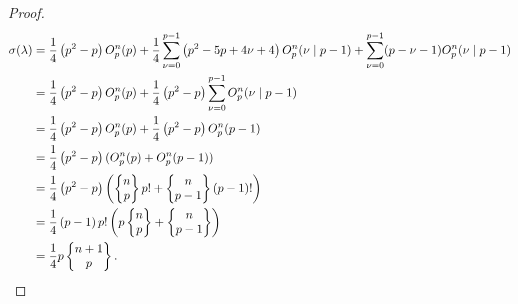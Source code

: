 \documentclass[10pt,a4paper]{amsart}
\begin{document}
\begin{proof}
\begingroup
\allowdisplaybreaks
     \begin{align*}
         \sigma(\lambda)&= \dfrac{1}{4}  \left( p^{2} -p  \right) O_p^n(  p)+ \dfrac{1}{4}   \sum_{\nu = 0}^{p-1} \left( p^{2}-5p+4\nu+4 \right) O_p^n(\nu \mid p-1)+\sum_{\nu = 0}^{p-1}  (p-\nu-1) O_p^n(\nu \mid p-1)\\
         &=\dfrac{1}{4}  \left( p^{2} -p  \right) O_p^n(  p)+\dfrac{1}{4}  \left( p^{2} -p  \right)  \sum_{\nu = 0}^{p-1}   O_p^n(\nu \mid p-1)\\
         &=\dfrac{1}{4}  \left( p^{2} -p  \right) O_p^n(  p)+\dfrac{1}{4}  \left( p^{2} -p  \right)    O_p^n(  p-1)\\
         &=\dfrac{1}{4}  \left( p^{2} -p  \right) (O_p^n(  p)+ O_p^n(  p-1))\\
         &=\dfrac{1}{4}  \left( p^{2} -p  \right) \left( \begin{Bmatrix}
             n\\p
         \end{Bmatrix}p! +\begin{Bmatrix}
             n\\p-1
         \end{Bmatrix}(p-1)! \right)\\
         &=\dfrac{1}{4}  \left( p -1  \right) p! \left( p\begin{Bmatrix}
             n\\p
         \end{Bmatrix} +\begin{Bmatrix}
             n\\p-1
         \end{Bmatrix} \right)\\
         &=\dfrac{1}{4}  p\begin{Bmatrix}
             n+1\\p
         \end{Bmatrix}.\qedhere
     \end{align*}
\endgroup
\end{proof}
\end{document}
